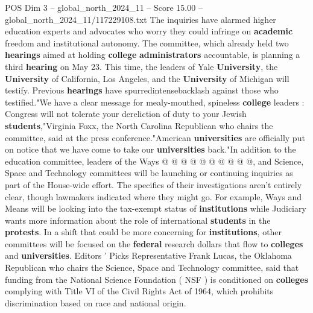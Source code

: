 \begin{textsample}{POS Dim 3 – global\_north\_2024\_11 – Score 15.00 – global\_north\_2024\_11/117229108.txt}
The inquiries have alarmed higher education experts and advocates who worry they could infringe on \textbf{academic} freedom and institutional autonomy.
The committee, which already held two \textbf{hearings} aimed at holding \textbf{college} \textbf{administrators} accountable, is planning a third \textbf{hearing} on May 23.
This time, the leaders of Yale \textbf{University}, the \textbf{University} of California, Los Angeles, and the \textbf{University} of Michigan will testify.
Previous \textbf{hearings} have spurredintensebacklash against those who testified."We have a clear message for mealy-mouthed, spineless \textbf{college} leaders : Congress will not tolerate your dereliction of duty to your Jewish \textbf{students},"Virginia Foxx, the North Carolina Republican who chairs the committee, said at the press conference."American \textbf{universities} are officially put on notice that we have come to take our \textbf{universities} back."In addition to the education committee, leaders of the Ways @ @ @ @ @ @ @ @ @ @, and Science, Space and Technology committees will be launching or continuing inquiries as part of the House-wide effort.
The specifics of their investigations aren't entirely clear, though lawmakers indicated where they might go.
For example, Ways and Means will be looking into the tax-exempt status of \textbf{institutions} while Judiciary wants more information about the role of international \textbf{students} in the \textbf{protests}.
In a shift that could be more concerning for \textbf{institutions}, other committees will be focused on the \textbf{federal} research dollars that flow to \textbf{colleges} and \textbf{universities}.
Editors ' Picks Representative Frank Lucas, the Oklahoma Republican who chairs the Science, Space and Technology committee, said that funding from the National Science Foundation ( NSF ) is conditioned on \textbf{colleges} complying with Title VI of the Civil Rights Act of 1964, which prohibits discrimination based on race and national origin.

\end{textsample}

